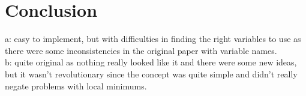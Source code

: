\documentclass[runningheads]{llncs}
\begin{document}



\section{Conclusion}
a:
easy to implement, but with difficulties in finding the right variables to use as there were some inconsistencies in the original paper with variable names. \\
b:
quite original as nothing really looked like it and there were some new ideas, but it wasn't revolutionary since the concept was quite simple and didn't really negate problems with local minimums.\\







\appendix
\end{document}
